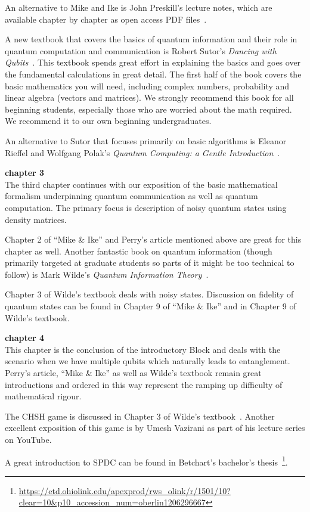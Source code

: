 An alternative to Mike and Ike is John Preskill's lecture notes, which are available chapter by chapter as open access PDF files~\cite{preskill:PH-CS219}.

A new textbook that covers the basics of quantum information and their role in quantum computation and communication is Robert Sutor's \emph{Dancing with Qubits}~\cite{sutor19:dancing}. This textbook spends great effort in explaining the basics and goes over the fundamental calculations in great detail. The first half of the book covers the basic mathematics you will need, including complex numbers, probability and linear algebra (vectors and matrices). We strongly recommend this book for all beginning students, especially those who are worried about the math required. We recommend it to our own beginning undergraduates.

An alternative to Sutor that focuses primarily on basic algorithms is Eleanor Rieffel and Wolfgang Polak's \emph{Quantum Computing: a Gentle Introduction}~\cite{rieffel2011quantum}.

{\bf chapter 3}\\

The third chapter continues with our exposition of the basic mathematical formalism underpinning quantum communication as well as quantum computation. The primary focus is description of noisy quantum states using density matrices.

Chapter 2 of “Mike \& Ike” and Perry’s article mentioned above are great for this chapter as well. Another fantastic book on quantum information (though primarily targeted at graduate students so parts of it might be too technical to follow) is Mark Wilde's \emph{Quantum Information Theory}~\cite{wilde2013quantum}.

Chapter 3 of Wilde’s textbook deals with noisy states. Discussion on fidelity of quantum states can be found in Chapter 9 of “Mike \& Ike” and in Chapter 9 of Wilde’s textbook.

{\bf chapter 4}\\

This chapter is the conclusion of the introductory Block and deals with the scenario when we have multiple qubits which naturally leads to entanglement. Perry’s article, “Mike \& Ike” as well as Wilde’s textbook remain great introductions and ordered in this way represent the ramping up difficulty of mathematical rigour. 

The CHSH game is discussed in Chapter 3 of Wilde’s textbook~\cite{wilde2013quantum}. Another excellent exposition of this game is by Umesh Vazirani as part of his lecture series on YouTube.

A great introduction to SPDC can be found in Betchart’s bachelor's thesis~\footnote{\url{https://etd.ohiolink.edu/apexprod/rws_olink/r/1501/10?clear=10&p10_accession_num=oberlin1206296667}}.

